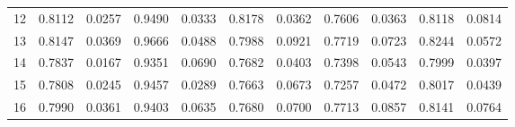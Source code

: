 \begin{tabular}{rrrrrrrrrrr}
        12 &   0.8112 & 0.0257 &               0.9490 & 0.0333 &                   0.8178 & 0.0362 &               0.7606 & 0.0363 &                       0.8118 & 0.0814 \\
        13 &   0.8147 & 0.0369 &               0.9666 & 0.0488 &                   0.7988 & 0.0921 &               0.7719 & 0.0723 &                       0.8244 & 0.0572 \\
        14 &   0.7837 & 0.0167 &               0.9351 & 0.0690 &                   0.7682 & 0.0403 &               0.7398 & 0.0543 &                       0.7999 & 0.0397 \\
        15 &   0.7808 & 0.0245 &               0.9457 & 0.0289 &                   0.7663 & 0.0673 &               0.7257 & 0.0472 &                       0.8017 & 0.0439 \\
        16 &   0.7990 & 0.0361 &               0.9403 & 0.0635 &                   0.7680 & 0.0700 &               0.7713 & 0.0857 &                       0.8141 & 0.0764 \\
\bottomrule
\end{tabular}
